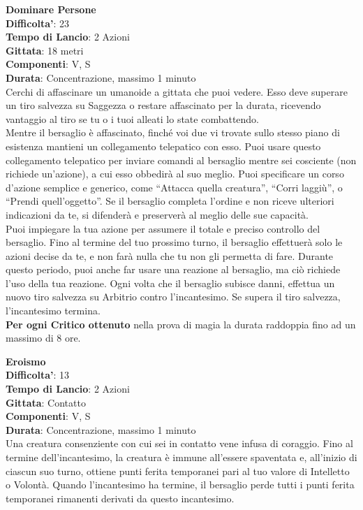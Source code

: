 \begin{multicols}{2}
\medskip\textbf{Dominare Persone}\\
\textbf{Difficolta'}: 23\\
\textbf{Tempo di Lancio}: 2 Azioni\\
\textbf{Gittata}: 18 metri\\
\textbf{Componenti}: V, S\\
\textbf{Durata}: Concentrazione, massimo 1 minuto\\
Cerchi di affascinare un umanoide a gittata che puoi vedere. Esso deve superare un tiro salvezza su Saggezza o restare affascinato per la durata, ricevendo vantaggio al tiro se tu o i tuoi alleati lo state combattendo.\\
Mentre il bersaglio è affascinato, finché voi due vi trovate sullo stesso piano di esistenza mantieni un collegamento telepatico con esso. Puoi usare questo collegamento telepatico per inviare comandi al bersaglio mentre sei cosciente (non richiede un’azione), a cui esso obbedirà al suo meglio. Puoi specificare un corso d’azione semplice e generico, come “Attacca quella creatura”, “Corri laggiù”, o “Prendi quell’oggetto”. Se il bersaglio completa l’ordine e non riceve ulteriori indicazioni da te, si difenderà e preserverà al meglio delle sue capacità.\\
Puoi impiegare la tua azione per assumere il totale e preciso controllo del bersaglio. Fino al termine del tuo prossimo turno, il bersaglio effettuerà solo le azioni decise da te, e non farà nulla che tu non gli permetta di fare. Durante questo periodo, puoi anche far usare una reazione al bersaglio, ma ciò richiede l’uso della tua reazione. Ogni volta che il bersaglio subisce danni, effettua un nuovo tiro salvezza su Arbitrio contro l’incantesimo. Se supera il tiro salvezza, l’incantesimo termina.\\
\textbf{Per ogni Critico ottenuto} nella prova di magia la durata raddoppia fino ad un massimo di 8 ore.

\medskip\textbf{Eroismo}\\
\textbf{Difficolta'}: 13\\
\textbf{Tempo di Lancio}: 2 Azioni\\
\textbf{Gittata}: Contatto\\
\textbf{Componenti}: V, S\\
\textbf{Durata}: Concentrazione, massimo 1 minuto\\
Una creatura consenziente con cui sei in contatto vene infusa di coraggio. Fino al termine dell’incantesimo, la creatura è immune all’essere spaventata e, all’inizio di ciascun suo turno, ottiene punti ferita temporanei pari al tuo valore di Intelletto o Volontà. Quando l’incantesimo ha termine, il bersaglio perde tutti  i punti ferita temporanei rimanenti derivati da questo
incantesimo.


\end{multicols}
